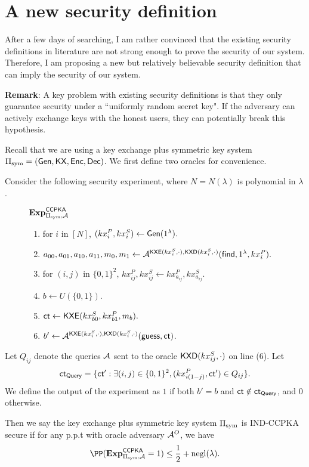 \clearpage
\newcommand{\Hyb}{\mathsf{Hyb}}
\newcommand{\Real}{\mathsf{Real}}
\newcommand{\Ideal}{\mathsf{Ideal}}
\section{A new security definition}
After a few days of searching, I am rather convinced that the existing security definitions in literature are not strong enough to prove the security of our system. Therefore, I am proposing a new but relatively believable security definition that can imply the security of our system.

\textbf{Remark}: A key problem with existing security definitions is that they only guarantee security under a ``uniformly random secret key". If the adversary can actively exchange keys with the honest users, they can potentially break this hypothesis.

Recall that we are using a key exchange plus symmetric key system $\Pi_{\text{sym}} = (\mathsf{Gen}, \mathsf{KX}, \mathsf{Enc}, \mathsf{Dec})$. We first define two oracles for convenience.

\begin{definition}
\label{defn:CCPKA}
Consider the following security experiment, where $N = N(\lambda)$ is polynomial in $\lambda$.
\begin{figure}[h!]
\begin{framed}
$\mathbf{Exp}^{\mathsf{CCPKA}}_{\Pi_{\text{sym}}, \mathcal{A}}$
\begin{enumerate}
    \item for $i$ in $[N]$, $(kx_{i}^P, kx_{i}^S) \leftarrow \mathsf{Gen}(1^{\lambda}).$
    \item $a_{00}, a_{01}, a_{10}, a_{11}, m_0, m_1 \leftarrow \mathcal{A}^{\mathsf{KXE}(kx_{i}^S, \cdot), \mathsf{KXD}(kx_{i}^S, \cdot)}(\mathsf{find}, 1^{\lambda}, kx_{i}^P).$
    \item for $(i, j)$ in $\{0, 1\}^2$, $kx^{P}_{ij}, kx^S_{ij} \leftarrow kx^P_{a_{ij}}, kx^S_{a_{ij}}$. 
    \item $b \leftarrow U(\{0, 1\})$.
    \item $\mathsf{ct} \leftarrow \mathsf{KXE}(kx_{b0}^S, kx_{b1}^P, m_b).$
    \item $b' \leftarrow \mathcal{A}^{\mathsf{KXE}(kx_{i}^S, \cdot), \mathsf{KXD}(kx_{i}^S, \cdot)}(\mathsf{guess}, \mathsf{ct})$.
\end{enumerate}
\end{framed}
\end{figure}

Let $Q_{ij}$ denote the queries $\mathcal{A}$ sent to the oracle $\mathsf{KXD}(kx_{ij}^S, \cdot)$ on line (6). Let
$$\mathsf{ct}_{\mathsf{Query}} = \{\mathsf{ct}': \exists (i,j) \in \{0, 1\}^2, (kx_{i(1 - j)}^P, \mathsf{ct}') \in Q_{ij}\}.$$
We define the output of the experiment as $1$ if both $b' = b$ and $\mathsf{ct} \notin \mathsf{ct}_{\mathsf{Query}}$, and $0$ otherwise. 

Then we say the key exchange plus symmetric key system $\Pi_{\text{sym}}$ is IND-CCPKA secure if for any p.p.t with oracle adversary $\mathcal{A}^O$, we have
$$\PP(\mathbf{Exp}^{\mathsf{CCPKA}}_{\Pi_{\sym}, \cA} = 1) \leq \frac{1}{2} + \negl(\lambda).$$
\end{definition}
